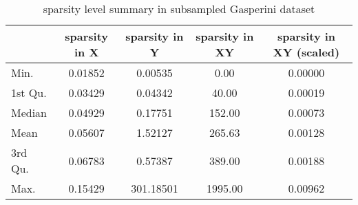 \begin{table}
\centering
\begin{tabular}[t]{lcccc}
\toprule
  & sparsity in X & sparsity in Y & sparsity in XY & sparsity in XY (scaled)\\
\midrule
Min. & 0.01852 & 0.00535 & 0.00 & 0.00000\\
1st Qu. & 0.03429 & 0.04342 & 40.00 & 0.00019\\
Median & 0.04929 & 0.17751 & 152.00 & 0.00073\\
Mean & 0.05607 & 1.52127 & 265.63 & 0.00128\\
3rd Qu. & 0.06783 & 0.57387 & 389.00 & 0.00188\\
Max. & 0.15429 & 301.18501 & 1995.00 & 0.00962\\
\bottomrule
\end{tabular}
\caption{sparsity level summary in subsampled Gasperini dataset}
\label{tab:sparsity_level}
\end{table}
